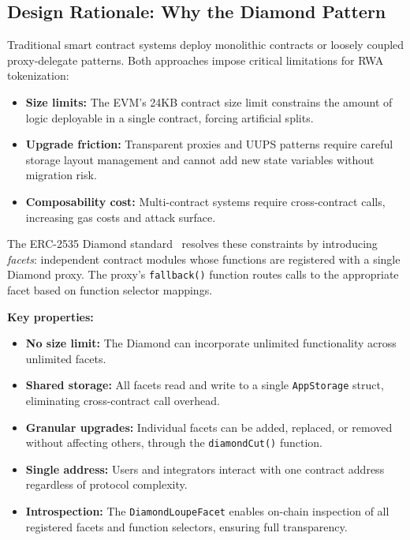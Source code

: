 \documentclass[11pt,a4paper]{article}
\begin{document}
\subsection{Design Rationale: Why the Diamond Pattern}

Traditional smart contract systems deploy monolithic contracts or loosely coupled proxy-delegate patterns. Both approaches impose critical limitations for RWA tokenization:

\begin{itemize}[nosep]
    \item \textbf{Size limits:} The EVM's 24KB contract size limit constrains the amount of logic deployable in a single contract, forcing artificial splits.
    \item \textbf{Upgrade friction:} Transparent proxies and UUPS patterns require careful storage layout management and cannot add new state variables without migration risk.
    \item \textbf{Composability cost:} Multi-contract systems require cross-contract calls, increasing gas costs and attack surface.
\end{itemize}

The ERC-2535 Diamond standard~\cite{mudge2020} resolves these constraints by introducing \textit{facets}: independent contract modules whose functions are registered with a single Diamond proxy. The proxy's \texttt{fallback()} function routes calls to the appropriate facet based on function selector mappings.

\textbf{Key properties:}
\begin{itemize}[nosep]
    \item \textbf{No size limit:} The Diamond can incorporate unlimited functionality across unlimited facets.
    \item \textbf{Shared storage:} All facets read and write to a single \texttt{AppStorage} struct, eliminating cross-contract call overhead.
    \item \textbf{Granular upgrades:} Individual facets can be added, replaced, or removed without affecting others, through the \texttt{diamondCut()} function.
    \item \textbf{Single address:} Users and integrators interact with one contract address regardless of protocol complexity.
    \item \textbf{Introspection:} The \texttt{DiamondLoupeFacet} enables on-chain inspection of all registered facets and function selectors, ensuring full transparency.
\end{itemize}
\end{document}
